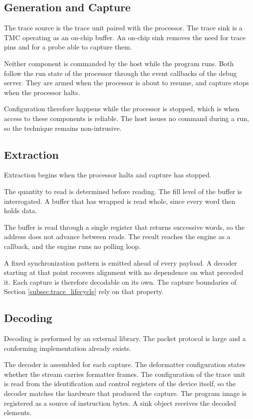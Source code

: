 \subsection{Generation and Capture}
\label{subsec:gen_capture}
The trace source is the trace unit paired with the processor. The trace sink is a TMC operating as an on-chip buffer. An on-chip sink removes the need for trace pins and for a probe able to capture them.

Neither component is commanded by the host while the program runs. Both follow the run state of the processor through the event callbacks of the debug server. They are armed when the processor is about to resume, and capture stops when the processor halts.

Configuration therefore happens while the processor is stopped, which is when access to these components is reliable. The host issues no command during a run, so the technique remains non-intrusive.

\subsection{Extraction}
Extraction begins when the processor halts and capture has stopped.

The quantity to read is determined before reading. The fill level of the buffer is interrogated. A buffer that has wrapped is read whole, since every word then holds data.

The buffer is read through a single register that returns successive words, so the address does not advance between reads. The result reaches the engine as a callback, and the engine runs no polling loop.

A fixed synchronization pattern is emitted ahead of every payload. A decoder starting at that point recovers alignment with no dependence on what preceded it. Each capture is therefore decodable on its own. The capture boundaries of Section \ref{subsec:trace_lifecycle} rely on that property.

\subsection{Decoding}
Decoding is performed by an external library. The packet protocol is large and a conforming implementation already exists.

The decoder is assembled for each capture. The deformatter configuration states whether the stream carries formatter frames. The configuration of the trace unit is read from the identification and control registers of the device itself, so the decoder matches the hardware that produced the capture. The program image is registered as a source of instruction bytes. A sink object receives the decoded elements.

